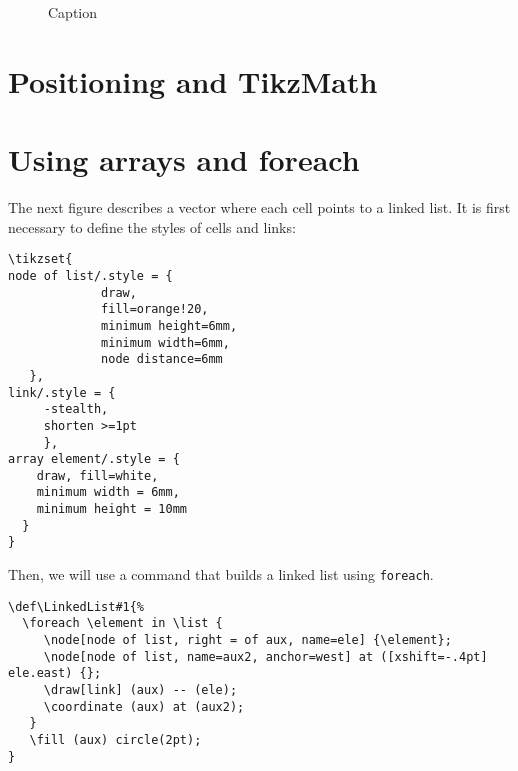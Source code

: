 \begin{figure}

    \caption{Caption}

\end{figure}


\section{Positioning and TikzMath}


\section{Using arrays and foreach}

The next figure describes a vector where each cell points to a linked list. It is first necessary to define the styles of cells and links:
\begin{verbatim}
\tikzset{
node of list/.style = {
             draw,
             fill=orange!20,
             minimum height=6mm,
             minimum width=6mm,
             node distance=6mm
   },
link/.style = {
     -stealth,
     shorten >=1pt
     },
array element/.style = {
    draw, fill=white,
    minimum width = 6mm,
    minimum height = 10mm
  }
}
\end{verbatim}


Then, we will use a command that builds a linked list using \verb|foreach|.
\begin{verbatim}
\def\LinkedList#1{%
  \foreach \element in \list {
     \node[node of list, right = of aux, name=ele] {\element};
     \node[node of list, name=aux2, anchor=west] at ([xshift=-.4pt] ele.east) {};
     \draw[link] (aux) -- (ele);
     \coordinate (aux) at (aux2);
   }
   \fill (aux) circle(2pt);
}
\end{verbatim}

